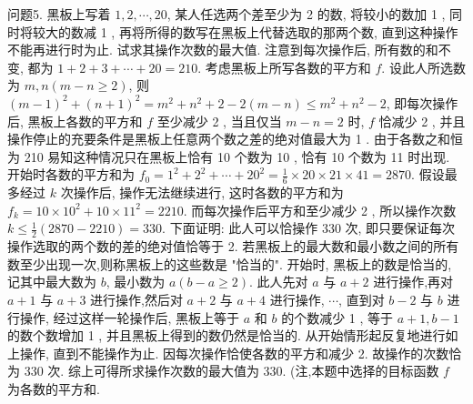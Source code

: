 问题5. 黑板上写着 $1,2, \cdots, 20$, 某人任选两个差至少为 2 的数, 将较小的数加 1 , 同时将较大的数减 1 , 再将所得的数写在黑板上代替选取的那两个数, 直到这种操作不能再进行时为止.
试求其操作次数的最大值.
注意到每次操作后, 所有数的和不变, 都为 $1+2+3+\cdots+20=210$. 考虑黑板上所写各数的平方和 $f$. 设此人所选数为 $m, n(m-n \geqslant 2)$, 则 $(m- 1)^2+(n+1)^2=m^2+n^2+2-2(m-n) \leqslant m^2+n^2-2$, 即每次操作后, 黑板上各数的平方和 $f$ 至少减少 2 , 当且仅当 $m-n=2$ 时, $f$ 恰减少 2 , 并且操作停止的充要条件是黑板上任意两个数之差的绝对值最大为 1 . 由于各数之和恒为 210 易知这种情况只在黑板上恰有 10 个数为 10 , 恰有 10 个数为 11 时出现.
开始时各数的平方和为 $f_0=1^2+2^2+\cdots+20^2=\frac{1}{6} \times 20 \times 21 \times 41=2870$. 假设最多经过 $k$ 次操作后, 操作无法继续进行, 这时各数的平方和为 $f_k= 10 \times 10^2+10 \times 11^2=2210$. 而每次操作后平方和至少减少 2 , 所以操作次数 $k \leqslant \frac{1}{2}(2870-2210)=330$. 下面证明: 此人可以恰操作 330 次, 即只要保证每次操作选取的两个数的差的绝对值恰等于 2. 若黑板上的最大数和最小数之间的所有数至少出现一次,则称黑板上的这些数是 "恰当的". 开始时, 黑板上的数是恰当的, 记其中最大数为 $b$, 最小数为 $a(b-a \geqslant 2)$. 此人先对 $a$ 与 $a+2$ 进行操作,再对 $a+1$ 与 $a+3$ 进行操作,然后对 $a+2$ 与 $a+4$ 进行操作, $\cdots$, 直到对 $b-2$ 与 $b$ 进行操作, 经过这样一轮操作后, 黑板上等于 $a$ 和 $b$ 的个数减少 1 , 等于 $a+1, b-1$ 的数个数增加 1 , 并且黑板上得到的数仍然是恰当的.
从开始情形起反复地进行如上操作, 直到不能操作为止.
因每次操作恰使各数的平方和减少 2. 故操作的次数恰为 330 次.
综上可得所求操作次数的最大值为 330. (注,本题中选择的目标函数 $f$ 为各数的平方和.


